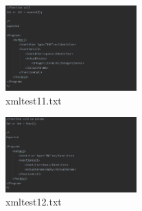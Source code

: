 \documentclass{article}
\begin{document}
\begin{multicols}{2}
			
					
					\begin{figure}[H]
					\centering
			 			\includegraphics[width=0.45\textwidth]{xmltest11.png}
			 			\centering
			  			\caption{xmltest11.txt}
			  			\label{fig:xmltest11}
					\end{figure}
					
					\begin{figure}[H]
					\centering
			 			\includegraphics[width=0.45\textwidth]{xmltest12.png}
			 			 \centering
			  			\caption{xmltest12.txt}
			  			\label{fig:xmltest12}
					\end{figure}
					
					
			\end{multicols}
		
		
		\nocite{*}



			
		
			
					
			
\end{document}
